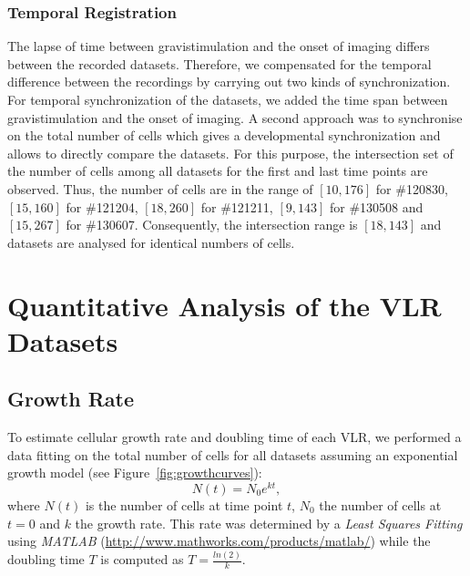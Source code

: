 \documentclass[11pt,a4paper, final]{article}
\begin{document}
\subsubsection{Temporal Registration}
\noindent
The lapse of time between gravistimulation and the onset of imaging differs between the recorded datasets. Therefore, we compensated for the temporal difference between the recordings by carrying out two kinds of synchronization. For temporal synchronization of the datasets, we added the time span between gravistimulation and the onset of imaging. A second approach was to synchronise on the total number of cells which gives a developmental synchronization and allows to directly compare the datasets. For this purpose, the intersection set of the number of cells among all datasets for the first and last time points are observed. Thus, the number of cells are in the range of $[10,176]$ for \#120830, $[15,160]$ for \#121204, $[18,260]$ for \#121211, $[9,143]$ for \#130508 and $[15,267]$ for \#130607. Consequently, the intersection range is $[18, 143]$ and datasets are analysed for identical numbers of cells.

\clearpage
\section{Quantitative Analysis of the VLR Datasets}
\subsection{Growth Rate}
To estimate cellular growth rate and doubling time of each VLR, we performed a data fitting on the total number of cells for all datasets assuming an exponential growth model (see Figure~\ref{fig:growthcurves}):
\begin{equation}
N(t)=N_0e^{kt},
\end{equation}
where $N(t)$ is the number of cells at time point $t$, $N_0$ the number of cells at $t=0$ and $k$ the growth rate. This rate was determined by a \textit{Least Squares Fitting} using \textit{MATLAB} (\href{http://www.mathworks.com/products/matlab/}{http://www.mathworks.com/products/matlab/}) while the doubling time $T$ is computed as $T=\frac{ln(2)}{k}$.
\end{document}
